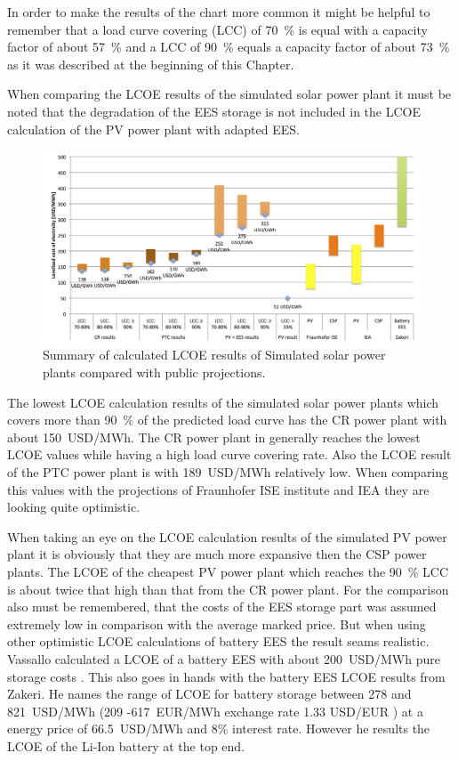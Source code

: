 In order to make the results of the chart more common it might be helpful to remember that a load curve covering (LCC) of 70~\% is equal with a capacity factor of about 57~\% and  a LCC of 90~\% equals a capacity factor of about 73~\% as it was described at the beginning of this Chapter.

When comparing the LCOE results of the simulated solar power plant it must be noted that the degradation of the EES storage is not included in the LCOE calculation of the PV power plant with adapted EES. 

\begin{figure}[htbp]  
\centering
\includegraphics[width=1\linewidth]{FIG/LCOEcomparision}
\caption[Summary of calculated LCOE results of Simulated solar power plants compared with public projections.]{Summary of calculated LCOE results of Simulated solar power plants compared with public projections.}\label{LCOEcomparision}
\end{figure}
The lowest LCOE calculation results of the simulated solar power plants which covers more than 90~\% of the predicted load curve has the CR power plant with about 150~USD/MWh. The CR power plant in generally reaches the lowest LCOE values while having a high load curve covering rate. Also the LCOE result of the PTC power plant is with 189~USD/MWh relatively low. When comparing this values with the projections of Fraunhofer ISE institute and IEA they are looking quite optimistic. 

When taking an eye on the LCOE calculation results of the simulated PV power plant it is obviously that they are much more expansive then the CSP power plants. The LCOE of the cheapest PV power plant which reaches the 90~\% LCC is about twice that high than that from the CR power plant. For the comparison also must be remembered, that the costs of the EES storage part was assumed extremely low in comparison with the average marked price. But when using other optimistic LCOE calculations of battery EES the result seams realistic. Vassallo calculated a LCOE of a battery EES with about 200~USD/MWh pure storage costs \cite{Corcuera2015}. This also goes in hands with the battery EES LCOE results from Zakeri. He names the range of LCOE for battery storage between 278 and 821~USD/MWh (209 -617~EUR/MWh exchange rate 1.33 USD/EUR \cite{StatistaGmbH2015})   at a energy price of 66.5~USD/MWh and 8\% interest rate\cite{Zakeri2015}. However he results the LCOE of the Li-Ion battery at the top end.




